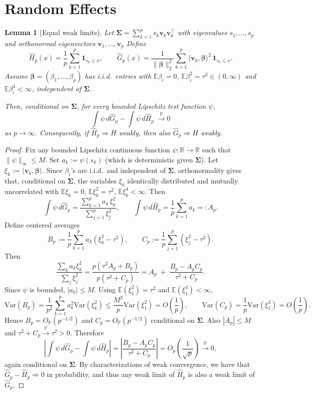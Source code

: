 \documentclass[10pt]{article}
\newcommand{\R}{\mathbb{R}}
\newcommand{\Var}{\mathrm{Var}}
\newtheorem{lemma}{Lemma}
\numberwithin{thm}{section}
\numberwithin{remark}{section}
\numberwithin{ex}{section}
\numberwithin{ass}{section}
\numberwithin{defn}{section}
\numberwithin{lemma}{section}
\numberwithin{corollary}{section}
\numberwithin{prop}{section}
\newcommand{\ee}{\mathbb{E}}
\def \bbeta{\pmb{\beta}}
\newcommand{\bSigma}{ { \Sigma} }
\def\bSigma{{\boldsymbol\Sigma}}
\numberwithin{equation}{section}
\renewcommand{\hat}{\widehat}
\begin{document}
\section{Random Effects}

\begin{lemma}[Equal weak limits]
\label{lem:same-weak-limits}
Let $\bSigma=\sum_{k=1}^p s_k \boldsymbol v_k \boldsymbol v_k^\top$ with eigenvalues $s_1,\dots,s_p$ and
orthonormal eigenvectors $\boldsymbol v_1,\dots,\boldsymbol v_p$
Define
\[
  \hat H_p(x)=\frac{1}{p}\sum_{k=1}^p \mathbf 1_{s_k\le x},\qquad
  \hat G_p(x)=\frac{1}{\|\bbeta\|_2^2}\sum_{k=1}^p \langle \boldsymbol  v_k,\bbeta\rangle^2\,\mathbf 1_{s_k\le x}.
\]
Assume $\bbeta=(\beta_1,\dots,\beta_p)$ has i.i.d.\ entries with $\ee\beta_i=0$,
$\ee\beta_i^2=\tau^2 \in(0,\infty)$ and $\ee\beta_i^4<\infty$, independent of $\bSigma$.

Then, conditional on $\bSigma$, for every bounded Lipschitz test function $\psi$,
\[
  \int \psi\, d\hat G_p - \int \psi\, d\hat H_p \;\xrightarrow{\mathbb{P}} 0
\]
as $p \rightarrow \infty$. Consequently, if $\hat H_p \Rightarrow H$ weakly, then also $\hat G_p \Rightarrow H$ weakly.
\end{lemma}

\begin{proof}
Fix any bounded Lipschitz continuous function $\psi:\R\to\R$ such that $\|\psi\|_\infty \le M$. Set $a_k:=\psi(s_k)$ (which is deterministic given $\bSigma$).
Let $\xi_k:=\langle \boldsymbol  v_k,\bbeta\rangle$. Since $\beta_i$'s are i.i.d.\ and independent of $\bSigma$,
orthonormality gives that, conditional on $\bSigma$, the variables $\xi_k$ identically distributed and mutually uncorrelated with
$\ee\xi_k=0$, $\ee\xi_k^2=\tau^2$, $\ee\xi_k^4<\infty$. Then
\[
  \int \psi\, d\hat G_p=\frac{\sum_{k=1}^p a_k\,\xi_k^2}{\sum_{j=1}^p \xi_j^2},
  \qquad
  \int \psi\, d\hat H_p=\frac{1}{p}\sum_{k=1}^p a_k=:A_p.
\]
Define centered averages
\[
  B_p:=\frac{1}{p}\sum_{k=1}^p a_k(\xi_k^2-\tau^2),\qquad
  C_p:=\frac{1}{p}\sum_{j=1}^p (\xi_j^2-\tau^2).
\]
Then
\[
  \frac{\sum_k a_k \xi_k^2}{\sum_j \xi_j^2}
  =\frac{p(\tau^2 A_p + B_p)}{p(\tau^2+C_p)}
  = A_p \;+\; \frac{B_p - A_p C_p}{\tau^2 + C_p}.
\]
Since $\psi$ is bounded, $|a_k|\le M$. Using $\ee(\xi_1^2)=\tau^2$ and $\ee(\xi_1^4)<\infty$,
\[
  \Var(B_p)=\frac{1}{p^2}\sum_{k=1}^p a_k^2\Var(\xi_k^2)\le \frac{M^2}{p}\Var(\xi_1^2)=O\!\left(\frac{1}{p}\right),
  \qquad
  \Var(C_p)=\frac{1}{p}\Var(\xi_1^2)=O\!\left(\frac{1}{p}\right).
\]
Hence $B_p=O_{\mathbb{P}}(p^{-1/2})$ and $C_p=O_{\mathbb{P}}(p^{-1/2})$ conditional on $\bSigma$.
Also $|A_p|\le M$ and $\tau^2+C_p\overset{\mathbb{P}}{\to}\tau^2>0$. Therefore
\[
  \left|\int \psi\, d\hat G_p - \int \psi\, d\hat H_p\right|
  =\left|\frac{B_p - A_p C_p}{\tau^2 + C_p}\right|
  =O_p\!\left(\frac{1}{\sqrt{p}}\right)\xrightarrow{\mathbb{P}}0,
\]
again conditional on $\bSigma$. By characterizations of weak convergence, we have that $\hat G_p-\hat H_p\Rightarrow 0$ in probability, and thus any weak limit
of $\hat H_p$ is also a weak limit of $\hat G_p$.
\end{proof}
\end{document}
